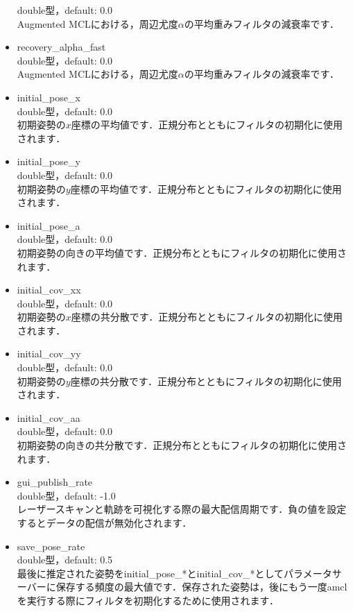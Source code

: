 \documentclass[{../../master}]{subfiles}
\begin{document}
\begin{itemize}
    double型，default: 0.0 \\
    Augmented MCLにおける，周辺尤度$\alpha$の平均重みフィルタの減衰率です．
  \item \textsf{recovery\_alpha\_fast} \\
    double型，default: 0.0 \\
    Augmented MCLにおける，周辺尤度$\alpha$の平均重みフィルタの減衰率です．
  \item \textsf{initial\_pose\_x} \\
    double型，default: 0.0 \\
    初期姿勢の$x$座標の平均値です．正規分布とともにフィルタの初期化に使用されます．
  \item \textsf{initial\_pose\_y} \\
    double型，default: 0.0 \\
    初期姿勢の$y$座標の平均値です．正規分布とともにフィルタの初期化に使用されます．
  \item \textsf{initial\_pose\_a} \\
    double型，default: 0.0 \\
    初期姿勢の向きの平均値です．正規分布とともにフィルタの初期化に使用されます．
  \item \textsf{initial\_cov\_xx} \\
    double型，default: 0.0 \\
    初期姿勢の$x$座標の共分散です．正規分布とともにフィルタの初期化に使用されます．
  \item \textsf{initial\_cov\_yy} \\
    double型，default: 0.0 \\
    初期姿勢の$y$座標の共分散です．正規分布とともにフィルタの初期化に使用されます．
  \item \textsf{initial\_cov\_aa} \\
    double型，default: 0.0 \\
    初期姿勢の向きの共分散です．正規分布とともにフィルタの初期化に使用されます．
  \item \textsf{gui\_publish\_rate} \\
    double型，default: -1.0 \\
    レーザースキャンと軌跡を可視化する際の最大配信周期です．負の値を設定するとデータの配信が無効化されます．
  \item \textsf{save\_pose\_rate} \\
    double型，default: 0.5 \\
    最後に推定された姿勢を\textsf{initial\_pose\_*}と\textsf{initial\_cov\_*}としてパラメータサーバーに保存する頻度の最大値です．保存された姿勢は，後にもう一度\textsf{amcl}を実行する際にフィルタを初期化するために使用されます．

\end{itemize}
\end{document}
